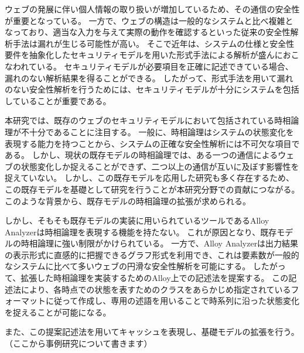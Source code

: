\documentclass[12pt,a4paper]{jbook}
\begin{document}
ウェブの発展に伴い個人情報の取り扱いが増加しているため、その通信の安全性が重要となっている。
一方で、ウェブの構造は一般的なシステムと比べ複雑となっており、適当な入力を与えて実際の動作を確認するといった従来の安全性解析手法は漏れが生じる可能性が高い。
そこで近年は、システムの仕様と安全性要件を抽象化したセキュリティモデルを用いた形式手法による解析が盛んにおこなわれている。
セキュリティモデルが必要項目を正確に記述できている場合、漏れのない解析結果を得ることができる。
したがって、形式手法を用いて漏れのない安全性解析を行うためには、セキュリティモデルが十分にシステムを包括していることが重要である。

本研究では、既存のウェブのセキュリティモデルにおいて包括されている時相論理が不十分であることに注目する。
一般に、時相論理はシステムの状態変化を表現する能力を持つことから、システムの正確な安全性解析には不可欠な項目である。
しかし、現状の既存モデルの時相論理では、ある一つの通信によるウェブの状態変化しか捉えることができず、二つ以上の通信が互いに及ぼす影響性を捉えていない。
しかし、この既存モデルを応用した研究も多く存在するため、この既存モデルを基礎として研究を行うことが本研究分野での貢献につながる。
このような背景から、既存モデルの時相論理の拡張が求められる。

しかし、そもそも既存モデルの実装に用いられているツールであるAlloy Analyzerは時相論理を表現する機能を持たない。
これが原因となり、既存モデルの時相論理に強い制限がかけられている。
一方で、Alloy Analyzerは出力結果の表示形式に直感的に把握できるグラフ形式を利用でき、これは要素数が一般的なシステムに比べて多いウェブの円滑な安全性解析を可能にする。
したがって、拡張した時相論理を実装するためのAlloy上での記述法を提案する。
この記述法により、各時点での状態を表すためのクラスをあらかじめ指定されているフォーマットに従って作成し、専用の述語を用いることで時系列に沿った状態変化を捉えることが可能になる。

また、この提案記述法を用いてキャッシュを表現し、基礎モデルの拡張を行う。
\\（ここから事例研究について書きます）
\end{document}
